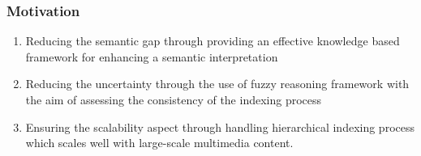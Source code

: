 		\begin{frame}
			\frametitle{Motivation}
			\begin{enumerate}
				\item Reducing the semantic gap through providing an \alert{effective knowledge based 
					framework for enhancing a semantic interpretation}
				\item Reducing the uncertainty through the use of \alert{fuzzy reasoning framework}
					with the aim of assessing the consistency of the indexing process
				\item Ensuring the \alert{scalability} aspect through handling hierarchical
					indexing process which scales well with large-scale multimedia content.
			\end{enumerate}	
		\end{frame}
